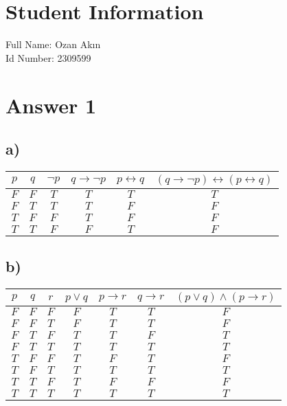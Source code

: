 \documentclass[12pt]{article}
\begin{document}
\section*{Student Information } 
Full Name: Ozan Akın \\
Id Number: 2309599 \\

\section*{Answer 1}

\subsection*{a)}

\begin{table}[h]
    \centering
    \begin{tabular}{c|c|c|c|c|c}
         $p$ & $q$ & $\neg p$ &$q \rightarrow \neg p$ & $p \leftrightarrow q$ & $(q \rightarrow \neg p) \leftrightarrow (p \leftrightarrow q)$ \\
         \hline
         $F$ & $F$ & $T$ & $T$ & $T$ & $T$ \\
         $F$ & $T$ & $T$ & $T$ & $F$ & $F$ \\
         $T$ & $F$ & $F$ & $T$ & $F$ & $F$ \\
         $T$ & $T$ & $F$ & $F$ & $T$ & $F$
     \end{tabular}
\end{table}

\subsection*{b)}

\begin{table}[H]
    \centering
    \begin{tabular}{c|c|c|c|c|c|c}
        $p$ & $q$ & $r$ & $p \lor q$ & $ p \rightarrow r$ & $q \rightarrow r$ & $(p \lor q) \land (p \rightarrow r)$ \\
        \hline
        $F$ & $F$ & $F$ & $F$ & $T$ & $T$ & $F$ \\
        $F$ & $F$ & $T$ & $F$ & $T$ & $T$ & $F$ \\
        $F$ & $T$ & $F$ & $T$ & $T$ & $F$ & $T$ \\
        $F$ & $T$ & $T$ & $T$ & $T$ & $T$ & $T$ \\
        $T$ & $F$ & $F$ & $T$ & $F$ & $T$ & $F$ \\
        $T$ & $F$ & $T$ & $T$ & $T$ & $T$ & $T$ \\
        $T$ & $T$ & $F$ & $T$ & $F$ & $F$ & $F$ \\
        $T$ & $T$ & $T$ & $T$ & $T$ & $T$ & $T$
     \end{tabular}
\end{table}
\end{document}
